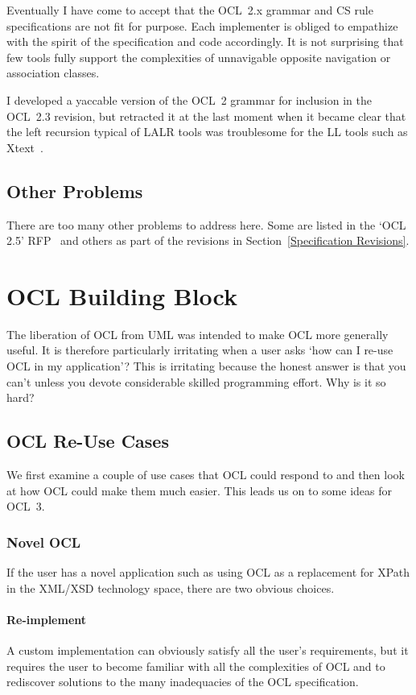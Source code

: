 \documentclass{jot}
\begin{document}
Eventually I have come to accept that the OCL~2.x grammar and CS rule specifications are not fit for purpose. Each implementer is obliged to empathize with the spirit of the specification and code accordingly. It is not surprising that few tools fully support the complexities of unnavigable opposite navigation or association classes.

I developed a yaccable version of the OCL~2 grammar for inclusion in the OCL~2.3 revision, but retracted it at the last moment when it became clear that the left recursion typical of LALR tools was troublesome for the LL tools such as Xtext~\cite{Eclipse-Xtext}. 

\subsection{Other Problems}

There are too many other problems to address here. Some are listed in the `OCL 2.5' RFP~\cite{OCL-2.0-RFP} and others as part of the revisions in Section~\ref{Specification Revisions}.

\section{OCL Building Block}\label{OCL Building Block}

The liberation of OCL from UML was intended to make OCL more generally useful. It is therefore particularly irritating when a user asks `how can I re-use OCL in my application'? This is irritating because the honest answer is that you can't unless you devote considerable skilled programming effort. Why is it so hard?

\subsection{OCL Re-Use Cases}

We first examine a couple of use cases that OCL could respond to and then look at how OCL could make them much easier. This leads us on to some ideas for OCL~3.

\subsubsection{Novel OCL}

If the user has a novel application such as using OCL as a replacement for XPath in the XML/XSD technology space, there are two obvious choices.

\paragraph{Re-implement} A custom implementation can obviously satisfy all the user's requirements, but it requires the user to become familiar with all the complexities of OCL and to rediscover solutions to the many inadequacies of the OCL specification.
\end{document}

